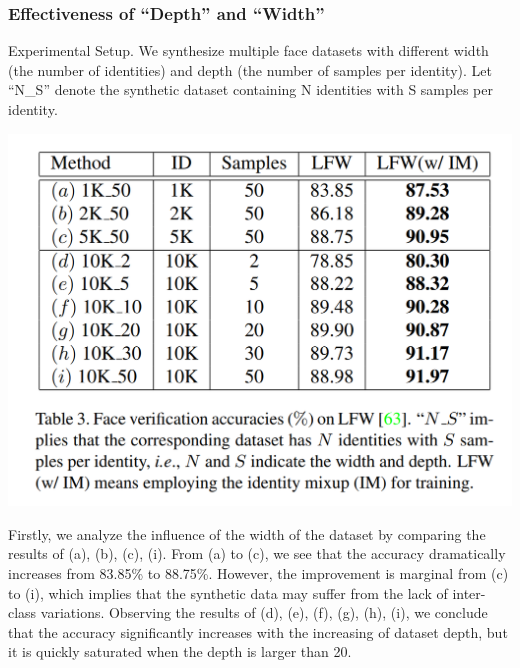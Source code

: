 \documentclass[12pt]{article}
\begin{document}
\subsubsection{Effectiveness of ``Depth'' and ``Width''}
Experimental Setup. We synthesize multiple face
datasets with different width (the number of identities) and
depth (the number of samples per identity). Let “N\_S” denote the synthetic dataset containing N identities with S
samples per identity.
\begin{center}
  \includegraphics[scale = 1]{img7.png}
\end{center}
Firstly, we analyze the influence of the width of the dataset
by comparing the results of (a), (b), (c), (i). From (a)
to (c), we see that the accuracy dramatically increases from
83.85\% to 88.75\%. However, the improvement is marginal
from (c) to (i), which implies that the synthetic data may
suffer from the lack of inter-class variations. Observing the results of (d), (e), (f), (g), (h), (i), we conclude that
the accuracy significantly increases with the increasing of
dataset depth, but it is quickly saturated when the depth
is larger than 20.
\end{document}
